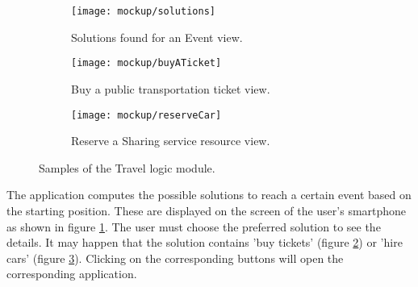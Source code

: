 \begin{figure}[H]	
	\begin{subfigure}{0.5\linewidth}
		\centering		
		\texttt{[image: mockup/solutions]} 
		\caption{Solutions found for an Event view.}
		\label{fig:solutions}
	\end{subfigure}
	\begin{subfigure}{0.5\linewidth}
		\texttt{[image: mockup/buyATicket]} 
		\centering
		\caption{Buy a public transportation ticket view.}
		\label{fig:buyTicket}
	\end{subfigure} 
	\hfill
	
	\bigskip	
	\begin{subfigure}{\linewidth}
			\centering
		\texttt{[image: mockup/reserveCar]} 
		\caption{Reserve a Sharing service resource view.}
		\label{fig:reserveCar}
	\end{subfigure}

	\caption{Samples of the Travel logic module.}
	\label{fig:travelLogic}
\end{figure}

The application computes the possible solutions to reach a certain event based on the starting position. These are displayed on the screen of the user's smartphone as shown in figure \ref{fig:solutions}. The user must choose the preferred solution to see the details. It may happen that the solution contains 'buy tickets' (figure \ref{fig:buyTicket}) or 'hire cars' (figure \ref{fig:reserveCar}). Clicking on the corresponding buttons will open the corresponding application.
